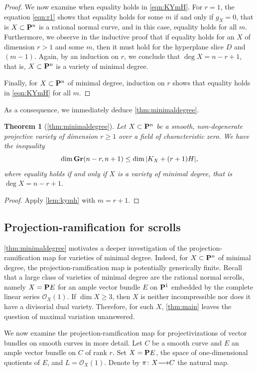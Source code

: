 \documentclass[11pt,reqno]{amsart}
\theoremstyle{plain}
\newtheorem{theorem}{Theorem}[section]
\theoremstyle{definition}
\theoremstyle{remark}
\numberwithin{equation}{section}
\renewcommand{\to}{{\longrightarrow}}
\numberwithin{equation}{section}
\renewcommand{\O}{\mathcal O}
\begin{document}
\begin{proof}
  We now examine when equality holds in \eqref{eqn:KYmH}.
  For $r = 1$, the equation \eqref{eqn:r1} shows that equality holds for some $m$ if and only if $g_X = 0$, that is $X \subset \P^n$ is a rational normal curve, and in this case, equality holds for all $m$.
  Furthermore, we observe in the inductive proof that if equality holds for an $X$ of dimension $r > 1$ and some $m$, then it must hold for the hyperplane slice $D$ and $(m-1)$.
  Again, by an induction on $r$, we conclude that $\deg X = n-r+1$, that is, $X \subset \P^n$ is a variety of minimal degree.

  Finally, for $X \subset \P^n$ of minimal degree, induction on $r$ shows that equality holds in \eqref{eqn:KYmH} for all $m$.
\end{proof}

As a consequence, we immediately deduce \autoref{thm:minimaldegree}.
\begin{theorem}[\autoref{thm:minimaldegree}]
  \label{thm:actualminimaldegree}
  Let $X \subset \P^n$ be a smooth, non-degenerate projective variety of dimension $r \geq 1$ over a field of characteristic zero.
  We have the inequality
  \[ \dim \Gr(n-r, n+1) \leq \dim |K_X + (r+1)H|,\]
  where equality holds if and only if $X$ is a variety of minimal degree, that is $\deg X = n-r+1$.
\end{theorem}
\begin{proof}
  Apply \autoref{lem:kymh} with $m = r+1$.
\end{proof}

\subsection{Projection-ramification for scrolls}\label{sec:prscrolls}
\autoref{thm:minimaldegree} motivates a deeper investigation of the projection-ramification map for varieties of minimal degree.
Indeed, for $X \subset \P^n$ of minimal degree, the projection-ramification map is potentially generically finite.
Recall that a large class of varieties of minimal degree are the rational normal scrolls, namely $X = \P E$ for an ample vector bundle $E$ on $\P^1$ embedded by the complete linear series $\O_X(1)$.
If $\dim X \geq 3$, then $X$ is neither incompressible nor does it have a divisorial dual variety.
Therefore, for such $X$, \autoref{thm:main} leaves the question of maximal variation unanswered.

We now examine the projection-ramification map for projectivizations of vector bundles on smooth curves in more detail.
Let $C$ be a smooth curve and $E$ an ample vector bundle on $C$ of rank $r$.
Set $X = \P E$, the space of one-dimensional quotients of $E$, and $L = \O_X(1)$.
Denote by $\pi \from X \to C$ the natural map.
\end{document}
